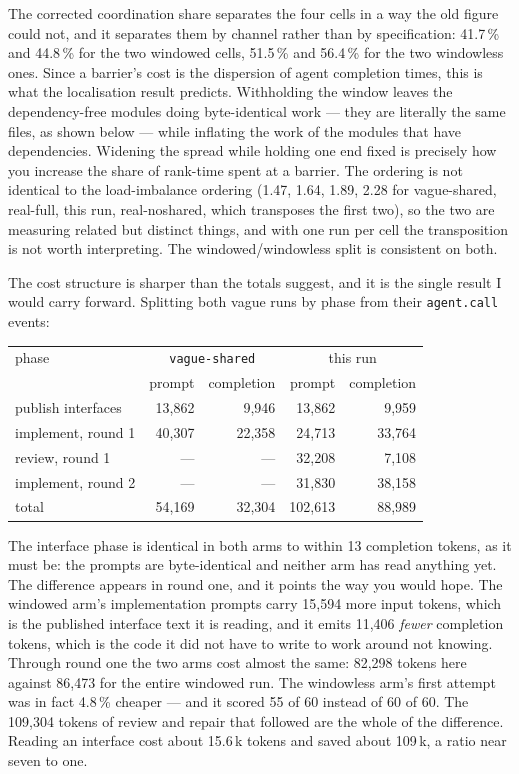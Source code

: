 \documentclass[11pt]{article}
\begin{document}
The corrected coordination share separates the four cells in a way the old figure could not, and
it separates them by channel rather than by specification: 41.7\,\% and 44.8\,\% for the two
windowed cells, 51.5\,\% and 56.4\,\% for the two windowless ones. Since a barrier's cost is the
dispersion of agent completion times, this is what the localisation result predicts. Withholding
the window leaves the dependency-free modules doing byte-identical work --- they are literally
the same files, as shown below --- while inflating the work of the modules that have
dependencies. Widening the spread while holding one end fixed is precisely how you increase the
share of rank-time spent at a barrier. The ordering is not identical to the load-imbalance
ordering (1.47, 1.64, 1.89, 2.28 for vague-shared, real-full, this run, real-noshared, which
transposes the first two), so the two are measuring related but distinct things, and with one run
per cell the transposition is not worth interpreting. The windowed/windowless split is consistent
on both.

The cost structure is sharper than the totals suggest, and it is the single result I would carry
forward. Splitting both vague runs by phase from their \texttt{agent.call} events:

\begin{center}
\begin{tabular}{@{}lrrrr@{}}
\toprule
phase & \multicolumn{2}{c}{\texttt{vague-shared}} & \multicolumn{2}{c}{this run} \\
 & prompt & completion & prompt & completion \\
\midrule
publish interfaces & 13,862 & 9,946 & 13,862 & 9,959 \\
implement, round 1 & 40,307 & 22,358 & 24,713 & 33,764 \\
review, round 1    & --- & --- & 32,208 & 7,108 \\
implement, round 2 & --- & --- & 31,830 & 38,158 \\
\midrule
total              & 54,169 & 32,304 & 102,613 & 88,989 \\
\bottomrule
\end{tabular}
\end{center}

The interface phase is identical in both arms to within 13 completion tokens, as it must be: the
prompts are byte-identical and neither arm has read anything yet. The difference appears in round
one, and it points the way you would hope. The windowed arm's implementation prompts carry 15,594
more input tokens, which is the published interface text it is reading, and it emits 11,406
\emph{fewer} completion tokens, which is the code it did not have to write to work around not
knowing. Through round one the two arms cost almost the same: 82,298 tokens here against 86,473
for the entire windowed run. The windowless arm's first attempt was in fact 4.8\,\% cheaper ---
and it scored 55 of 60 instead of 60 of 60. The 109,304 tokens of review and repair that followed
are the whole of the difference. Reading an interface cost about 15.6\,k tokens and saved about
109\,k, a ratio near seven to one.
\end{document}
